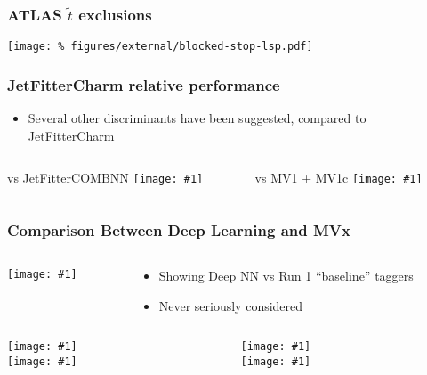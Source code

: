 \documentclass[usenames,dvipsnames]{beamer}
\newcommand{\widegraphic}[1]{\texttt{[image: \#1]}}
\begin{document}
\begin{frame}
  \frametitle{ATLAS $\tilde{t}$ exclusions}
  \texttt{[image: \%
    figures/external/blocked-stop-lsp.pdf]}
\end{frame}


\begin{frame}
  \frametitle{JetFitterCharm relative performance}
  \begin{itemize}
  \item Several other discriminants have been suggested, compared to JetFitterCharm
  \end{itemize}
  \begin{columns}
    \begin{column}{0.5\textwidth}
      \begin{center}
        vs JetFitterCOMBNN
      \widegraphic{figures/external/ctag-2d-jfc-vs-jfit.pdf}
      \end{center}
    \end{column}
    \begin{column}{0.5\textwidth}
      \begin{center}
        vs MV1 + MV1c
      \widegraphic{figures/external/ctag-2d-jfc-vs-mv.pdf}
      \end{center}
    \end{column}
  \end{columns}
\end{frame}


\begin{frame}
  \frametitle{Comparison Between Deep Learning and MVx}
  \begin{columns}
    \begin{column}{0.5\textwidth}
      \widegraphic{figures/external/ctag-2d-gaia-vs-mv.pdf}
    \end{column}
    \begin{column}{0.5\textwidth}
      \begin{itemize}
      \item Showing Deep NN vs Run 1 ``baseline'' taggers
      \item Never seriously considered
      \end{itemize}
    \end{column}
  \end{columns}
\end{frame}

\begin{frame}
  \begin{columns}
    \begin{column}{0.45\textwidth}
      \widegraphic{int/figures/stackplots/dans/signal_mct150/met.pdf} \\
      \widegraphic{int/figures/stackplots/dans/signal_mct150/j0_pt.pdf}
    \end{column}
    \begin{column}{0.45\textwidth}
      \widegraphic{int/figures/stackplots/dans/signal_mct150/j1_pt.pdf} \\
      \widegraphic{int/figures/stackplots/dans/signal_mct150/j2_pt.pdf}
    \end{column}
  \end{columns}
\end{frame}
\end{document}
